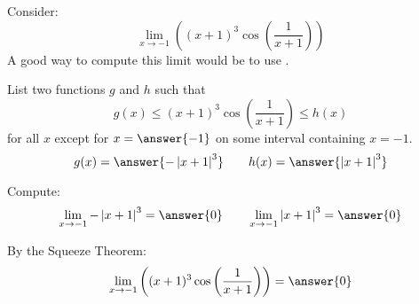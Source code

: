 \documentclass{ximera}
\author{Bart Snapp}
\begin{document}
\begin{exercise}


Consider:
\[
\lim_{x\to -1} \left((x+1)^3 \cos \left(\frac{1}{x+1}\right)\right)
\]
A good way to compute this limit would be to use .
\begin{exercise}
List two functions $g$ and $h$ such that
\[
g(x)\le (x+1)^3 \cos \left(\frac{1}{x+1}\right) \le h(x)
\]
for all $x$ except for $x=\answer{-1}$ on some interval containing $x=-1$.
\[
g(x)=\answer{-\left| x+1\right| ^3}\qquad h(x) =\answer{\left| x+1\right| ^3}
\]
\begin{exercise}
Compute:
\[
\lim_{x \to -1}-\left| x+1\right| ^3 = \answer{0}\qquad \lim_{x\to -1}\left| x+1\right| ^3 = \answer{0}
\]
\begin{exercise}
By the Squeeze Theorem:
\[
\lim_{x\to -1} \left((x+1)^3 \cos \left(\frac{1}{x+1}\right)\right) = \answer{0}
\]
\end{exercise}
\end{exercise}
\end{exercise}
\end{exercise}
\end{document}
